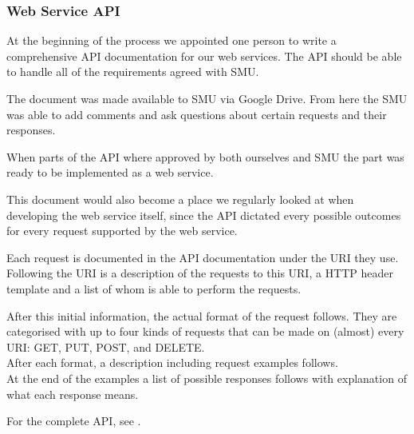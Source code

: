 \subsubsection{Web Service API}
At the beginning of the process we appointed one person to write a comprehensive API documentation for our web services.
The API should be able to handle all of the requirements agreed with SMU.

The document was made available to SMU via Google Drive. From here the SMU was able to add comments and ask questions about certain requests and their responses.

When parts of the API where approved by both ourselves and SMU the part was ready to be implemented as a web service.

This document would also become a place we regularly looked at when developing the web service itself, since the API dictated every possible outcomes for every request supported by the web service.

Each request is documented in the API documentation under the URI they use. Following the URI is a description of the requests to this URI, a HTTP header template and a list of whom is able to perform the requests.

After this initial information, the actual format of the request follows. They are categorised with up to four kinds of requests that can be made on (almost) every URI: GET, PUT, POST, and DELETE. \\
After each format, a description including request examples follows. \\
At the end of the examples a list of possible responses follows with explanation of what each response means.

For the complete API, see .